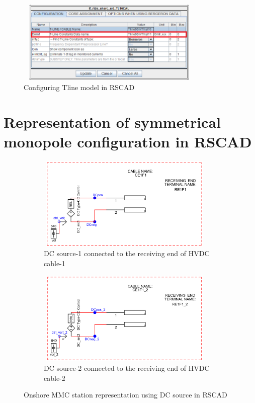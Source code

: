 \begin{figure}[H]
  \centering
  \includegraphics[height = 4cm,width = 9cm]{Diagrams/Chapter_4/TlineParaBlock_side1_mark.png}  
  \caption{Configuring Tline model in RSCAD}
  \label{fig:Tline_config_RSCAD}
\end{figure}

\section{Representation of symmetrical monopole configuration in RSCAD}
\begin{figure}[H]
\centering
\begin{subfigure}{.5\textwidth}
  \centering
  \includegraphics[height=4.5cm,width=8.5cm]{Diagrams/Chapter_4/DC_Source_Cab1.PNG}
  \caption{DC source-1 connected to the receiving end of HVDC cable-1}
  \label{DC_Source_Cab1}
\end{subfigure}%
\begin{subfigure}{.5\textwidth}
  \centering
  \includegraphics[height=4.5cm,width=8.5cm]{Diagrams/Chapter_4/DC_Source_Cab2.PNG}
  \caption{DC source-2 connected to the receiving end of HVDC cable-2}
  \label{DC_Source_Cab2}
\end{subfigure}
\caption{Onshore MMC station representation using DC source in RSCAD}
\label{fig:DC_source_cab}
\end{figure}



